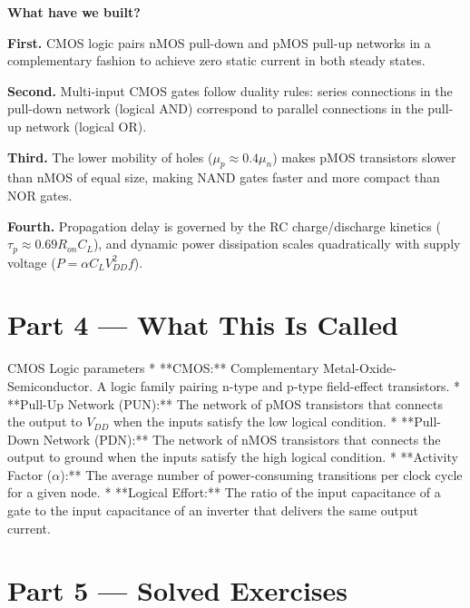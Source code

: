 \documentclass[12pt, a4paper]{book}
\begin{document}
\begin{discoverybox}
\textbf{What have we built?}

\textbf{First.} CMOS logic pairs nMOS pull-down and pMOS pull-up networks in a complementary fashion to achieve zero static current in both steady states.

\textbf{Second.} Multi-input CMOS gates follow duality rules: series connections in the pull-down network (logical AND) correspond to parallel connections in the pull-up network (logical OR).

\textbf{Third.} The lower mobility of holes ($\mu_p \approx 0.4 \mu_n$) makes pMOS transistors slower than nMOS of equal size, making NAND gates faster and more compact than NOR gates.

\textbf{Fourth.} Propagation delay is governed by the RC charge/discharge kinetics ($\tau_p \approx 0.69 R_{on} C_L$), and dynamic power dissipation scales quadratically with supply voltage ($P = \alpha C_L V_{DD}^2 f$).
\end{discoverybox}

\newpage

\section{Part 4 --- What This Is Called}

\begin{namedconcept}{CMOS Logic parameters}
* **CMOS:** Complementary Metal-Oxide-Semiconductor. A logic family pairing n-type and p-type field-effect transistors.
* **Pull-Up Network (PUN):** The network of pMOS transistors that connects the output to $V_{DD}$ when the inputs satisfy the low logical condition.
* **Pull-Down Network (PDN):** The network of nMOS transistors that connects the output to ground when the inputs satisfy the high logical condition.
* **Activity Factor ($\alpha$):** The average number of power-consuming transitions per clock cycle for a given node.
* **Logical Effort:** The ratio of the input capacitance of a gate to the input capacitance of an inverter that delivers the same output current.
\end{namedconcept}

\newpage

\section{Part 5 --- Solved Exercises}
\end{document}
